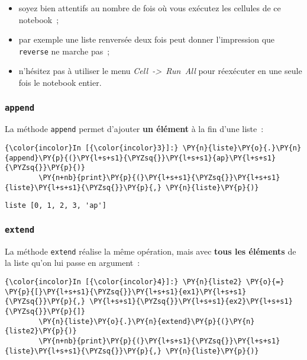 \begin{itemize}
\tightlist
\item
  soyez bien attentifs au nombre de fois où vous exécutez les cellules
  de ce notebook~;
\item
  par exemple une liste renversée deux fois peut donner l'impression que
  \texttt{reverse} ne marche pas~;
\item
  n'hésitez pas à utiliser le menu \emph{Cell~-\textgreater{}~Run~All}
  pour réexécuter en une seule fois le notebook entier.
\end{itemize}

    \hypertarget{append}{%
\subsubsection{\texorpdfstring{\texttt{append}}{append}}\label{append}}

    La méthode \texttt{append} permet d'ajouter \textbf{un élément} à la fin
d'une liste~:

    \begin{Verbatim}[commandchars=\\\{\}]
{\color{incolor}In [{\color{incolor}3}]:} \PY{n}{liste}\PY{o}{.}\PY{n}{append}\PY{p}{(}\PY{l+s+s1}{\PYZsq{}}\PY{l+s+s1}{ap}\PY{l+s+s1}{\PYZsq{}}\PY{p}{)}
        \PY{n+nb}{print}\PY{p}{(}\PY{l+s+s1}{\PYZsq{}}\PY{l+s+s1}{liste}\PY{l+s+s1}{\PYZsq{}}\PY{p}{,} \PY{n}{liste}\PY{p}{)}
\end{Verbatim}


    \begin{Verbatim}[commandchars=\\\{\}]
liste [0, 1, 2, 3, 'ap']

    \end{Verbatim}

    \hypertarget{extend}{%
\subsubsection{\texorpdfstring{\texttt{extend}}{extend}}\label{extend}}

    La méthode \texttt{extend} réalise la même opération, mais avec
\textbf{tous les éléments} de la liste qu'on lui passe en argument~:

    \begin{Verbatim}[commandchars=\\\{\}]
{\color{incolor}In [{\color{incolor}4}]:} \PY{n}{liste2} \PY{o}{=} \PY{p}{[}\PY{l+s+s1}{\PYZsq{}}\PY{l+s+s1}{ex1}\PY{l+s+s1}{\PYZsq{}}\PY{p}{,} \PY{l+s+s1}{\PYZsq{}}\PY{l+s+s1}{ex2}\PY{l+s+s1}{\PYZsq{}}\PY{p}{]}
        \PY{n}{liste}\PY{o}{.}\PY{n}{extend}\PY{p}{(}\PY{n}{liste2}\PY{p}{)}
        \PY{n+nb}{print}\PY{p}{(}\PY{l+s+s1}{\PYZsq{}}\PY{l+s+s1}{liste}\PY{l+s+s1}{\PYZsq{}}\PY{p}{,} \PY{n}{liste}\PY{p}{)}
\end{Verbatim}


